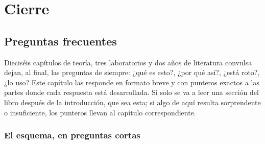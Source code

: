 
\part{Cierre}\label{part:cierre}

\chapter{Preguntas frecuentes}\label{ch:faq}

\begin{roadmap}
Dieciséis capítulos de teoría, tres laboratorios y dos años de
literatura convulsa dejan, al final, las preguntas de siempre: ¿qué
es esto?, ¿por qué así?, ¿está roto?, ¿lo uso? Este capítulo las
responde en formato breve y con punteros exactos a las partes donde
cada respuesta está desarrollada. Si solo se va a leer una sección
del libro después de la introducción, que sea esta; si algo de aquí
resulta sorprendente o insuficiente, los punteros llevan al capítulo
correspondiente.
\end{roadmap}

\section{El esquema, en preguntas cortas}

